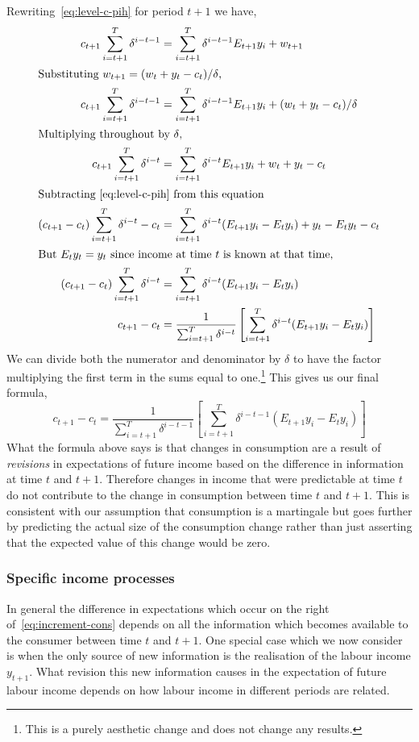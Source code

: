 \documentclass[12pt,reqno]{amsart}
\begin{document}
Rewriting~\eqref{eq:level-c-pih} for period $t+1$ we have,
\begin{align*}
c_{t+1}\sum_{i=t+1}^T \delta^{i-t-1}  &= \sum_{i=t+1}^T \delta^{i-t-1} E_{t+1} y_i +
w_{t+1}\\
\intertext{Substituting $w_{t+1}=(w_t+y_t-c_t)/\delta$,}
c_{t+1}\sum_{i=t+1}^T \delta^{i-t-1}  &= \sum_{i=t+1}^T \delta^{i-t-1} E_{t+1} y_i +
(w_t+y_t-c_t)/\delta\\
\intertext{Multiplying throughout by $\delta$,}
c_{t+1}\sum_{i=t+1}^T \delta^{i-t}  &= \sum_{i=t+1}^T \delta^{i-t} E_{t+1} y_i +
w_t+y_t-c_t\\
\intertext{Subtracting~\eqref{eq:level-c-pih} from this equation}
(c_{t+1}-c_t)\sum_{i=t+1}^T \delta^{i-t}-c_t&=\sum_{i=t+1}^T
\delta^{i-t} (E_{t+1} y_i-E_t y_i) + y_t - E_ty_t-c_t\\
\intertext{But $E_ty_t=y_t$ since income at time $t$ is known at that
time,}
(c_{t+1}-c_t)\sum_{i=t+1}^T \delta^{i-t}&=\sum_{i=t+1}^T
\delta^{i-t} (E_{t+1} y_i-E_t y_i)\\
c_{t+1}-c_t&=\frac{1}{\sum_{i=t+1}^T \delta^{i-t}}\left[\sum_{i=t+1}^T
\delta^{i-t} (E_{t+1} y_i-E_t y_i)\right]\\
\end{align*}
We can divide both the numerator and denominator by $\delta$ to have
the factor multiplying the first term in the sums equal to
one.\footnote{This is a purely aesthetic change and does not change
  any results.} This gives us our final formula,
\begin{equation}\label{eq:increment-cons}
c_{t+1}-c_t=\frac{1}{\sum_{i=t+1}^T \delta^{i-t-1}}\left[\sum_{i=t+1}^T
\delta^{i-t-1} (E_{t+1} y_i-E_t y_i)\right]
\end{equation}
What the formula above says is that changes in consumption are
a result of \emph{revisions} in expectations of future income based on
the difference in information at time $t$ and $t+1$. Therefore
changes in income that were predictable at time $t$ do not contribute
to the change in consumption between time $t$ and $t+1$. This is
consistent with our assumption that consumption is a martingale but
goes further by predicting the actual size of the consumption change
rather than just asserting that the expected value of this change
would be zero.

\subsubsection{Specific income processes}
In general the difference in expectations which occur on the right
of~\eqref{eq:increment-cons} depends on all the information which
becomes available to the consumer between time $t$ and $t+1$. One
special case which we now consider is when the only source of new
information is the realisation of the labour income $y_{t+1}$. What
revision this new information causes in the expectation of future
labour income depends on how labour income in different periods are related.
\end{document}
